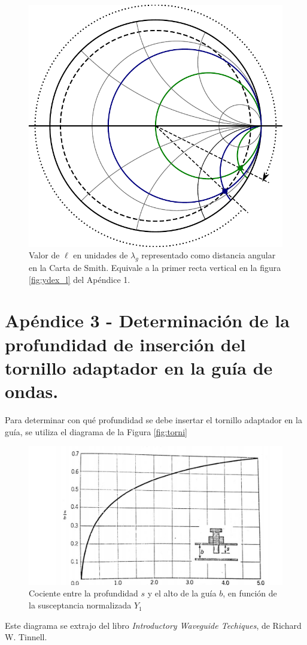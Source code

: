\documentclass[11pt,a4paper]{article}
\begin{document}
\begin{appendices}
\begin{multicols}{2}
\begin{figure}[H]
        \includegraphics[width=0.8\linewidth]{Images/smith4.pdf}
        \caption{Valor de $\ell$ en unidades de $\lambda_g$ representado como distancia angular en la Carta de Smith. Equivale a la primer recta vertical en la figura \ref{fig:ydex_l} del Apéndice 1.}
        \label{fig:smith4}
    \end{figure}


\end{multicols}

\pagebreak
\section{Apéndice 3 - Determinación de la profundidad de inserción del tornillo adaptador en la guía de ondas.}
Para determinar con qué profundidad se debe insertar el tornillo adaptador en la guía, se utiliza el diagrama de la 
Figura \ref{fig:torni} 
\begin{figure}[H]
    \centering
    \includegraphics[scale=0.75]{Images/Apendice 2.jpg}
    \caption{Cociente entre la profundidad $s$ y el alto de la guía $b$, en función de la susceptancia normalizada $Y_1$}
\end{figure}\label{fig:torni}
Este diagrama se extrajo del libro \textit{Introductory Waveguide Techiques}, de Richard W. Tinnell.\cite{tinnell_1974}

\end{appendices}


\begin{multicols}{2}

\end{multicols}
\end{document}
